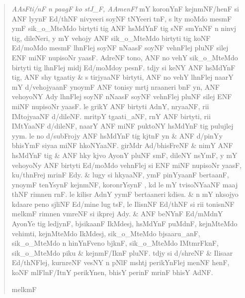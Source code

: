 \documentclass[12pt,paper=a4]{scrartcl}
\newcommand{\fw}[1]{\textit{#1}} %
\newenvironment{ayeri}{
    \doublespacing
    \Tagati
}{
}
\begin{document}
\begin{quotation}
	\begin{ayeri}
		\fw{AAsFti/nF n paagF ko stJ\_F, AAmenF!} %
			mY koronYnF kejnmNF/henF si ANF lyynF Ed/thNF nivyeeri 
			soyNF tNYeeri tnF, s lty moMdo mesmF ymF sik\_o\_MteMdo 
			birtyti tig ANF hsMdYnF tig sNF smYnNF n ninvj tig, 
			dileNeri, y mY vehojy ANF sik\_o\_MteMdo birtyti tig 
			koNF Ed/moMdo mesmF lhnFlej soyNF nNaasF soyNF vehnF\-lej 
			pluNF silej ENF miNF nupisoNr yaasF. %
		AdreNF tono, ANF no vehY sik\_o\_MteMdo birtyti tig lhnFlej midj 
			Ed/moMdoy pesnF. %
		tdjy si keNY ANF hsMdYnF tig, ANF shy tgaatiy \& s tirj\-yaaNF 
			birtyti, ANF no vehY lhnF\-lej naarY mY d/vehojyaanF 
			ynoymF ANF tonisy mrtj nraaneri bnF yn, ANF veho\-yoNY 
			Ady lhnFlej soyNF nNaasF soyNF vehnF\-lej pluNF silej ENF 
			miNF nupisoNr yaasF. %
		le grikY ANF birtyti AdnY, nryaaNF, rii IMtojyaaNF d/dileNF. %
		mritpY tgaati\_aNF, rnY ANF birtyti, rii IMtYaaNF d/dileNF,
			naarY ANF miNF puktoNY hsMdYnF tig pulujlej yym. %
		le no d/subFrojy ANF hsMdYnF tig kjtnF yn \& ANF d/pinYy bhisYmF 
			siyaa miNF hkoNYaaNF. %
		girMdr Ad/bhisFreNF \& nimY ANF hsMdYnF tig \& ANF hky kjvo 
			AyonY pluNF smF, dileNY nsYmF, y mY vehoyoNy ANF 
			birtyti Ed/moMdo vehnF\-lej si ENF miNF nupisoNr yaasF, 
			ku/thnFrej mrinF Edy. %
		\& lugy si hkyaaNF, ymF pinYyaanF bertaanF, ynoymF tenYsynF 
			kejnmNF, koronrYsynF \+, kd le mY tvisoNYaaNF maaj 
			thNF rimnen rnF. %
		le kilisr AdnY yymF bertaa\-neri kdisu. %
		\& n mY nksojyo kdaare peno sjliNF Ed/mine lug tsF, le IlisnNF
			Ed/thNF si rii tonisnNF melkmF rimnen vmreNF si ikprej 
			Ady. %
		\& ANF beNYnF Ed/mMdnY AyonYe tig ledjynF, bjsikaanF IkMdesj, 
			hsMdYnF puMdnF, kej\-nM\-teMdo vehimti, kej\-nM\-teMdo 
			IkMdesj, sik\_o\_MteMdo bjsaaru\_anF, sik\_o\_MteMdo n 
			hinYnFveno bjknF, sik\_o\_MteMdo IMtmrFknF, 
			sik\_o\_MteMdo piku \& kejnmF/IknF pluNF. %
		tdjy si d/shreNF \& Ilisaar Ed/\-thNF\-lej, kurnreNF vesNY n 
			pNlF mshtj perikYnFlej menNF henF, koNF mlFlnF/ItnY 
			perikYnen, bhisY perinF mrinF bhisY AdNF. %
		\begin{center}
			melkmF
		\end{center}
	\end{ayeri}
\end{quotation}
\end{document}
